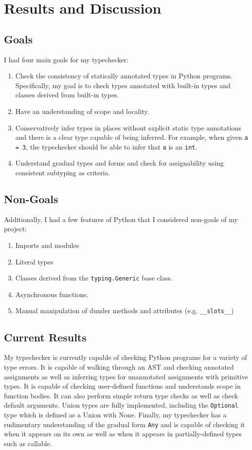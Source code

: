\documentclass[10pt,twocolumn]{article}
\begin{document}
\section{Results and Discussion}

\subsection{Goals}

I had four main goals for my typechecker:
\begin{enumerate}
    \item Check the consistency of statically annotated types in Python programs. Specifically, my goal is to check types annotated with built-in types and classes derived from built-in types. 
    \item Have an understanding of scope and locality.
    \item Conservatively infer types in places without explicit static type annotations and there is a clear type capable of being inferred. For example, when given \verb|a = 3|, the typechecker should be able to infer that \verb|a| is an \verb|int|.
    \item Understand gradual types and forms and check for assignability using consistent subtyping as criteria. 
    \end{enumerate}

\subsection{Non-Goals}

Additionally, I had a few features of Python that I considered non-goals of my project:
\begin{enumerate}
    \item Imports and modules
    \item Literal types
    \item Classes derived from the \verb|typing.Generic| base class.
    \item Asynchronous functions.
    \item Manual manipulation of dunder methods and attributes (e.g. \verb|__slots__|)
\end{enumerate}

\subsection{Current Results}

My typechecker is currently capable of checking Python programs for a variety of type errors. It is capable of walking through an AST and checking annotated assignments as well as inferring types for unannotated assignments with primitive types. It is capable of checking user-defined functions and understands scope in function bodies. It can also perform simple return type checks as well as check default arguments. Union types are fully implemented, including the \verb|Optional| type which is defined as a Union with None. Finally, my typechecker has a rudimentary understanding of the gradual form \verb|Any| and is capable of checking it when it appears on its own as well as when it appears in partially-defined types such as callable. 
\end{document}

